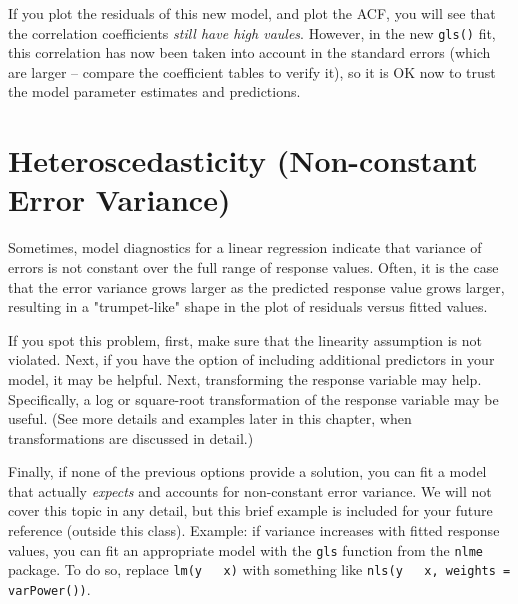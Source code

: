 \documentclass[twoside]{book}\usepackage[]{graphicx}\usepackage[]{xcolor}
\newcounter{example}[section]
\begin{document}
If you plot the residuals of this new model, and plot the ACF, you will see that the correlation coefficients \emph{still have high vaules}.  However, in the new \texttt{gls()} fit, this correlation has now been taken into account in the standard errors (which are larger -- compare the coefficient tables to verify it), so it is OK now to trust the model parameter estimates and predictions.

\section{Heteroscedasticity (Non-constant Error Variance)}
Sometimes, model diagnostics for a linear regression indicate that variance of errors is not constant over the full range of response values.  Often, it is the case that the error variance grows larger as the predicted response value grows larger, resulting in a "trumpet-like" shape in the plot of residuals versus fitted values.

If you spot this problem, first, make sure that the linearity assumption is not violated. Next, if you have the option of including additional predictors in your model, it may be helpful.  Next, transforming the response variable may help.  Specifically, a log or square-root transformation of the response variable may be useful.  (See more details and examples later in this chapter, when transformations are discussed in detail.) 

Finally, if none of the previous options provide a solution, you can fit a model that actually \emph{expects} and accounts for non-constant error variance. We will not cover this topic in any detail, but this brief example is included for your future reference (outside this class).  Example: if variance increases with fitted response values, you can fit an appropriate model with the \texttt{gls} function from the \texttt{nlme} package.  To do so, replace \texttt{lm(y ~ x)} with something like \texttt{nls(y ~ x, weights = varPower())}.
\end{document}

